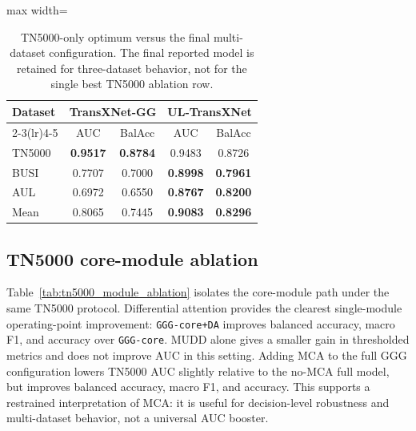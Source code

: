 \begin{table}[t]
    \centering
    \small
    \caption{TN5000-only optimum versus the final multi-dataset configuration. The final reported model is retained for three-dataset behavior, not for the single best TN5000 ablation row.}
    \label{tab:gg_vs_final_selection}
    \begin{adjustbox}{max width=\columnwidth}
    \begin{tabular}{lcccc}
        \toprule
        Dataset & \multicolumn{2}{c}{TransXNet-GG} & \multicolumn{2}{c}{UL-TransXNet} \\
        \cmidrule(lr){2-3}\cmidrule(lr){4-5}
        & AUC & BalAcc & AUC & BalAcc \\
        \midrule
        TN5000 & \textbf{0.9517} & \textbf{0.8784} & 0.9483 & 0.8726 \\
        BUSI & 0.7707 & 0.7000 & \textbf{0.8998} & \textbf{0.7961} \\
        AUL & 0.6972 & 0.6550 & \textbf{0.8767} & \textbf{0.8200} \\
        \midrule
        Mean & 0.8065 & 0.7445 & \textbf{0.9083} & \textbf{0.8296} \\
        \bottomrule
    \end{tabular}
    \end{adjustbox}
\end{table}

\subsection{TN5000 core-module ablation}
Table~\ref{tab:tn5000_module_ablation} isolates the core-module path under the same TN5000 protocol. Differential attention provides the clearest single-module operating-point improvement: \texttt{GGG-core+DA} improves balanced accuracy, macro F1, and accuracy over \texttt{GGG-core}. MUDD alone gives a smaller gain in thresholded metrics and does not improve AUC in this setting. Adding MCA to the full GGG configuration lowers TN5000 AUC slightly relative to the no-MCA full model, but improves balanced accuracy, macro F1, and accuracy. This supports a restrained interpretation of MCA: it is useful for decision-level robustness and multi-dataset behavior, not a universal AUC booster.


